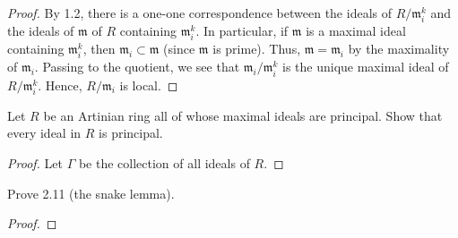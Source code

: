 \begin{proof}
By 1.2, there is a one-one correspondence between the ideals of
$R/\mathfrak{m}_i^k$ and the ideals of $\mathfrak{m}$ of $R$
containing $\mathfrak{m}_i^k$. In particular, if $\mathfrak{m}$
is a maximal ideal containing $\mathfrak{m}_i^k$, then
$\mathfrak{m}_i\subset\mathfrak{m}$ (since $\mathfrak{m}$ is
prime). Thus, $\mathfrak{m}=\mathfrak{m}_i$ by the maximality of
$\mathfrak{m}_i$. Passing to the quotient, we see that
$\mathfrak{m}_i/\mathfrak{m}_i^k$ is the unique maximal ideal of
$R/\mathfrak{m}_i^k$. Hence, $R/\mathfrak{m}_i$ is local.
\end{proof}
\newpage
\begin{problem}
Let $R$ be an Artinian ring all of whose maximal ideals are
principal. Show that every ideal in $R$ is principal.
\end{problem}
\begin{proof}
Let $\Gamma$ be the collection of all ideals of $R$.
\end{proof}
\newpage
\begin{problem}
Prove 2.11 (the snake lemma).
\end{problem}
\begin{proof}
\end{proof}

